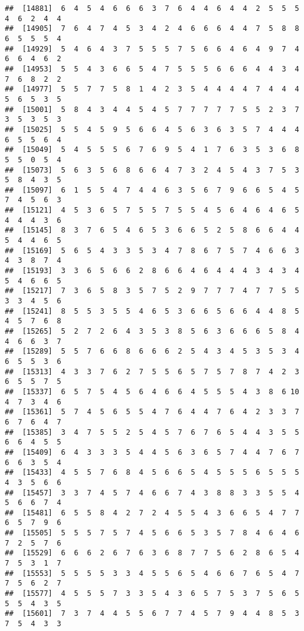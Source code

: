 \documentclass[
]{book}
\begin{document}
\begin{verbatim}
##  [14881]  6  4  5  4  6  6  6  3  7  6  4  4  6  4  4  2  5  5  5  4  6  2  4  4
##  [14905]  7  6  4  7  4  5  3  4  2  4  6  6  6  4  4  7  5  8  8  6  5  5  5  4
##  [14929]  5  4  6  4  3  7  5  5  5  7  5  6  6  4  6  4  9  7  4  6  6  4  6  2
##  [14953]  5  5  4  3  6  6  5  4  7  5  5  5  6  6  6  4  4  3  4  7  6  8  2  2
##  [14977]  5  5  7  7  5  8  1  4  2  3  5  4  4  4  4  7  4  4  4  5  6  5  3  5
##  [15001]  5  8  4  3  4  4  5  4  5  7  7  7  7  7  5  5  2  3  7  3  5  3  5  3
##  [15025]  5  5  4  5  9  5  6  6  4  5  6  3  6  3  5  7  4  4  4  6  5  5  6  4
##  [15049]  5  4  5  5  5  6  7  6  9  5  4  1  7  6  3  5  3  6  8  5  5  0  5  4
##  [15073]  5  6  3  5  6  8  6  6  4  7  3  2  4  5  4  3  7  5  3  5  8  4  3  5
##  [15097]  6  1  5  5  4  7  4  4  6  3  5  6  7  9  6  6  5  4  5  7  4  5  6  3
##  [15121]  4  5  3  6  5  7  5  5  7  5  5  4  5  6  4  6  4  6  5  4  4  4  3  6
##  [15145]  8  3  7  6  5  4  6  5  3  6  6  5  2  5  8  6  6  4  4  5  4  4  6  5
##  [15169]  5  6  5  4  3  3  5  3  4  7  8  6  7  5  7  4  6  6  3  4  3  8  7  4
##  [15193]  3  3  6  5  6  6  2  8  6  6  4  6  4  4  4  3  4  3  4  5  4  6  6  5
##  [15217]  7  3  6  5  8  3  5  7  5  2  9  7  7  7  4  7  7  5  5  3  3  4  5  6
##  [15241]  8  5  5  3  5  5  4  6  5  3  6  6  5  6  6  4  4  8  5  4  5  7  6  8
##  [15265]  5  2  7  2  6  4  3  5  3  8  5  6  3  6  6  6  5  8  4  4  6  6  3  7
##  [15289]  5  5  7  6  6  8  6  6  6  2  5  4  3  4  5  3  5  3  4  6  5  5  3  6
##  [15313]  4  3  3  7  6  2  7  5  5  6  5  7  5  7  8  7  4  2  3  6  5  5  7  5
##  [15337]  6  5  7  5  4  5  6  4  6  6  4  5  5  5  4  3  8  6 10  4  7  3  4  6
##  [15361]  5  7  4  5  6  5  5  4  7  6  4  4  7  6  4  2  3  3  7  6  7  6  4  7
##  [15385]  3  4  7  5  5  2  5  4  5  7  6  7  6  5  4  4  3  5  5  6  6  4  5  5
##  [15409]  6  4  3  3  3  5  4  4  5  6  3  6  5  7  4  4  7  6  7  6  6  3  5  4
##  [15433]  4  5  5  7  6  8  4  5  6  6  5  4  5  5  5  6  5  5  5  4  3  5  6  6
##  [15457]  3  3  7  4  5  7  4  6  6  7  4  3  8  8  3  3  5  5  4  5  6  6  7  4
##  [15481]  6  5  5  8  4  2  7  2  4  5  5  4  3  6  6  5  4  7  7  6  5  7  9  6
##  [15505]  5  5  5  7  5  7  4  5  6  6  5  3  5  7  8  4  6  4  6  7  2  5  7  6
##  [15529]  6  6  6  2  6  7  6  3  6  8  7  7  5  6  2  8  6  5  4  7  5  3  1  7
##  [15553]  5  5  5  5  3  3  4  5  5  6  5  4  6  6  7  6  5  4  7  7  5  6  2  7
##  [15577]  4  5  5  5  7  3  3  5  4  3  6  5  7  5  3  7  5  6  5  5  5  4  3  5
##  [15601]  7  3  7  4  4  5  5  6  7  7  4  5  7  9  4  4  8  5  3  7  5  4  3  3

\end{verbatim}
\end{document}
